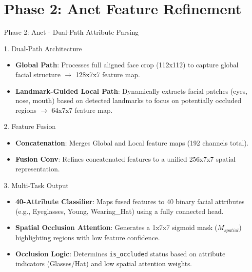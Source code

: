 \documentclass[t]{beamer}
\begin{document}
\section{Phase 2: Anet Feature Refinement}

\begin{frame}[allowframebreaks]{Phase 2: Anet - Dual-Path Attribute Parsing}
    \begin{block}{1. Dual-Path Architecture}
        \begin{itemize}
            \item \textbf{Global Path}: Processes full aligned face crop (112x112) to capture global facial structure $\rightarrow$ 128x7x7 feature map.
            \item \textbf{Landmark-Guided Local Path}: Dynamically extracts facial patches (eyes, nose, mouth) based on detected landmarks to focus on potentially occluded regions $\rightarrow$ 64x7x7 feature map.
        \end{itemize}
    \end{block}

    \begin{block}{2. Feature Fusion}
        \begin{itemize}
            \item \textbf{Concatenation}: Merges Global and Local feature maps (192 channels total).
            \item \textbf{Fusion Conv}: Refines concatenated features to a unified 256x7x7 spatial representation.
        \end{itemize}
    \end{block}
    \framebreak

    \begin{block}{3. Multi-Task Output}
        \begin{itemize}
            \item \textbf{40-Attribute Classifier}: Maps fused features to 40 binary facial attributes (e.g., Eyeglasses, Young, Wearing\_Hat) using a fully connected head.
            \item \textbf{Spatial Occlusion Attention}: Generates a 1x7x7 sigmoid mask ($M_{spatial}$) highlighting regions with low feature confidence.
            \item \textbf{Occlusion Logic}: Determines \texttt{is\_occluded} status based on attribute indicators (Glasses/Hat) and low spatial attention weights.
        \end{itemize}
    \end{block}
\end{frame}
\end{document}
